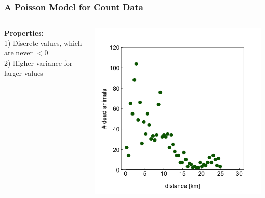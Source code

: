 \documentclass{beamer}
\begin{document}
\begin{frame}
    \frametitle{A Poisson Model for Count Data}
    \large
    \begin{columns}
        \begin{column}{0.5\textwidth}
            \textbf{Properties:}\\
            1) Discrete values, which are never $< 0$\\
            2) Higher variance for larger values
        \end{column}
        \begin{column}{0.5\textwidth}
            \includegraphics[width=\textwidth]{lectures/day_9_refreshing_glm/figures/unnamed-chunk-19-1.png}
        \end{column}
    \end{columns}
\end{frame}
\end{document}
